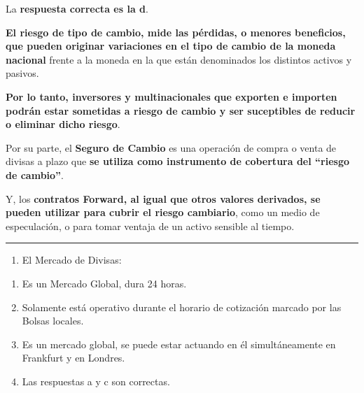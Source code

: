 \documentclass[
  letterpaper,
  DIV=11,
  numbers=noendperiod]{scrreprt}
\providecommand{\tightlist}{%
  \setlength{\itemsep}{0pt}\setlength{\parskip}{0pt}}\usepackage{longtable,booktabs,array}
\begin{document}
\begin{tcolorbox}[enhanced jigsaw, left=2mm, opacityback=0, colback=white, breakable, arc=.35mm, bottomrule=.15mm, rightrule=.15mm, toprule=.15mm, leftrule=.75mm, colframe=quarto-callout-tip-color-frame]
\begin{minipage}[t]{5.5mm}
\textcolor{quarto-callout-tip-color}{\faLightbulb}
\end{minipage}%
\begin{minipage}[t]{\textwidth - 5.5mm}

La \textbf{respuesta correcta es la d}.

\textbf{El riesgo de tipo de cambio, mide las pérdidas, o menores
beneficios, que pueden originar variaciones en el tipo de cambio de la
moneda nacional} frente a la moneda en la que están denominados los
distintos activos y pasivos.

\textbf{Por lo tanto, inversores y multinacionales que exporten e
importen podrán estar sometidas a riesgo de cambio y ser suceptibles de
reducir o eliminar dicho riesgo}.

Por su parte, el \textbf{Seguro de Cambio} es una operación de compra o
venta de divisas a plazo que \textbf{se utiliza como instrumento de
cobertura del ``riesgo de cambio''}.

Y, los \textbf{contratos Forward, al igual que otros valores derivados,
se pueden utilizar para cubrir el riesgo cambiario}, como un medio de
especulación, o para tomar ventaja de un activo sensible al tiempo.

\end{minipage}%
\end{tcolorbox}

\begin{center}\rule{0.5\linewidth}{0.5pt}\end{center}

\begin{enumerate}
\def\labelenumi{\arabic{enumi}.}
\setcounter{enumi}{35}
\tightlist
\item
  El Mercado de Divisas:
\end{enumerate}

\begin{enumerate}
\def\labelenumi{\alph{enumi}.}
\item
  Es un Mercado Global, dura 24 horas.
\item
  Solamente está operativo durante el horario de cotización marcado por
  las Bolsas locales.
\item
  Es un mercado global, se puede estar actuando en él simultáneamente en
  Frankfurt y en Londres.
\item
  Las respuestas a y c son correctas.
\end{enumerate}
\end{document}
